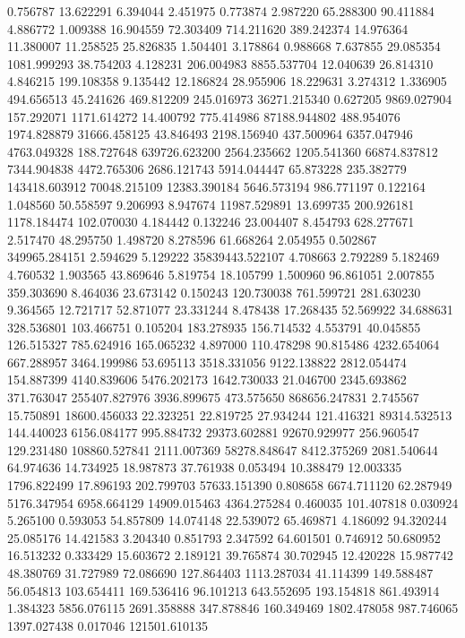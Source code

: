 0.756787
13.622291
6.394044
2.451975
0.773874
2.987220
65.288300
90.411884
4.886772
1.009388
16.904559
72.303409
714.211620
389.242374
14.976364
11.380007
11.258525
25.826835
1.504401
3.178864
0.988668
7.637855
29.085354
1081.999293
38.754203
4.128231
206.004983
8855.537704
12.040639
26.814310
4.846215
199.108358
9.135442
12.186824
28.955906
18.229631
3.274312
1.336905
494.656513
45.241626
469.812209
245.016973
36271.215340
0.627205
9869.027904
157.292071
1171.614272
14.400792
775.414986
87188.944802
488.954076
1974.828879
31666.458125
43.846493
2198.156940
437.500964
6357.047946
4763.049328
188.727648
639726.623200
2564.235662
1205.541360
66874.837812
7344.904838
4472.765306
2686.121743
5914.044447
65.873228
235.382779
143418.603912
70048.215109
12383.390184
5646.573194
986.771197
0.122164
1.048560
50.558597
9.206993
8.947674
11987.529891
13.699735
200.926181
1178.184474
102.070030
4.184442
0.132246
23.004407
8.454793
628.277671
2.517470
48.295750
1.498720
8.278596
61.668264
2.054955
0.502867
349965.284151
2.594629
5.129222
35839443.522107
4.708663
2.792289
5.182469
4.760532
1.903565
43.869646
5.819754
18.105799
1.500960
96.861051
2.007855
359.303690
8.464036
23.673142
0.150243
120.730038
761.599721
281.630230
9.364565
12.721717
52.871077
23.331244
8.478438
17.268435
52.569922
34.688631
328.536801
103.466751
0.105204
183.278935
156.714532
4.553791
40.045855
126.515327
785.624916
165.065232
4.897000
110.478298
90.815486
4232.654064
667.288957
3464.199986
53.695113
3518.331056
9122.138822
2812.054474
154.887399
4140.839606
5476.202173
1642.730033
21.046700
2345.693862
371.763047
255407.827976
3936.899675
473.575650
868656.247831
2.745567
15.750891
18600.456033
22.323251
22.819725
27.934244
121.416321
89314.532513
144.440023
6156.084177
995.884732
29373.602881
92670.929977
256.960547
129.231480
108860.527841
2111.007369
58278.848647
8412.375269
2081.540644
64.974636
14.734925
18.987873
37.761938
0.053494
10.388479
12.003335
1796.822499
17.896193
202.799703
57633.151390
0.808658
6674.711120
62.287949
5176.347954
6958.664129
14909.015463
4364.275284
0.460035
101.407818
0.030924
5.265100
0.593053
54.857809
14.074148
22.539072
65.469871
4.186092
94.320244
25.085176
14.421583
3.204340
0.851793
2.347592
64.601501
0.746912
50.680952
16.513232
0.333429
15.603672
2.189121
39.765874
30.702945
12.420228
15.987742
48.380769
31.727989
72.086690
127.864403
1113.287034
41.114399
149.588487
56.054813
103.654411
169.536416
96.101213
643.552695
193.154818
861.493914
1.384323
5856.076115
2691.358888
347.878846
160.349469
1802.478058
987.746065
1397.027438
0.017046
121501.610135
